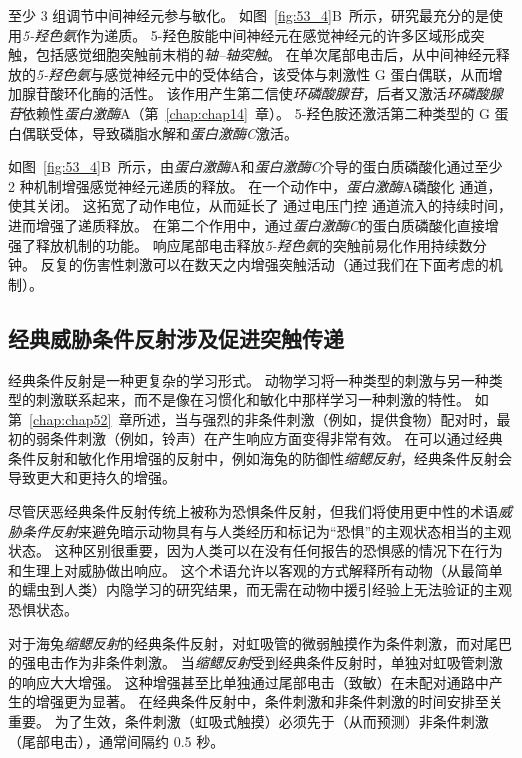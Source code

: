 至少 3 组调节中间神经元参与敏化。
如图~\ref{fig:53_4}B~所示，研究最充分的是使用\textit{5-羟色氨}作为递质。
5-羟色胺能中间神经元在感觉神经元的许多区域形成突触，包括感觉细胞突触前末梢的\textit{轴–轴突触}。
在单次尾部电击后，从中间神经元释放的\textit{5-羟色氨}与感觉神经元中的受体结合，该受体与刺激性 G 蛋白偶联，从而增加腺苷酸环化酶的活性。
该作用产生第二信使\textit{环磷酸腺苷}，后者又激活\textit{环磷酸腺苷}依赖性\textit{蛋白激酶}A（第~\ref{chap:chap14}~章）。
5-羟色胺还激活第二种类型的 G 蛋白偶联受体，导致磷脂水解和\textit{蛋白激酶C}激活。


如图~\ref{fig:53_4}B~所示，由\textit{蛋白激酶}A和\textit{蛋白激酶C}介导的蛋白质磷酸化通过至少 2 种机制增强感觉神经元递质的释放。
在一个动作中，\textit{蛋白激酶}A磷酸化  通道，使其关闭。
这拓宽了动作电位，从而延长了  通过电压门控  通道流入的持续时间，进而增强了递质释放。
在第二个作用中，通过\textit{蛋白激酶C}的蛋白质磷酸化直接增强了释放机制的功能。
响应尾部电击释放\textit{5-羟色氨}的突触前易化作用持续数分钟。
反复的伤害性刺激可以在数天之内增强突触活动（通过我们在下面考虑的机制）。



\subsection{经典威胁条件反射涉及促进突触传递}

经典条件反射是一种更复杂的学习形式。
动物学习将一种类型的刺激与另一种类型的刺激联系起来，而不是像在习惯化和敏化中那样学习一种刺激的特性。
如第~\ref{chap:chap52}~章所述，当与强烈的非条件刺激（例如，提供食物）配对时，最初的弱条件刺激（例如，铃声）在产生响应方面变得非常有效。
在可以通过经典条件反射和敏化作用增强的反射中，例如海兔的防御性\textit{缩鳃反射}，经典条件反射会导致更大和更持久的增强。


尽管厌恶经典条件反射传统上被称为恐惧条件反射，但我们将使用更中性的术语\textit{威胁条件反射}来避免暗示动物具有与人类经历和标记为“恐惧”的主观状态相当的主观状态。
这种区别很重要，因为人类可以在没有任何报告的恐惧感的情况下在行为和生理上对威胁做出响应。
这个术语允许以客观的方式解释所有动物（从最简单的蠕虫到人类）内隐学习的研究结果，而无需在动物中援引经验上无法验证的主观恐惧状态。


对于海兔\textit{缩鳃反射}的经典条件反射，对虹吸管的微弱触摸作为条件刺激，而对尾巴的强电击作为非条件刺激。
当\textit{缩鳃反射}受到经典条件反射时，单独对虹吸管刺激的响应大大增强。
这种增强甚至比单独通过尾部电击（致敏）在未配对通路中产生的增强更为显著。 
在经典条件反射中，条件刺激和非条件刺激的时间安排至关重要。
为了生效，条件刺激（虹吸式触摸）必须先于（从而预测）非条件刺激（尾部电击），通常间隔约 0.5 秒。


